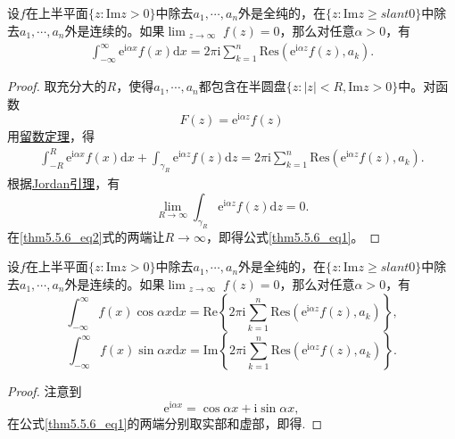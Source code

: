 \documentclass[../../main.tex]{subfiles}
\begin{document}
\begin{theorem}\label{theorem:定理5.5.6}
设$f$在上半平面$\{ z: \mathrm{Im} z > 0 \}$中除去$a_1, \cdots, a_n$外是全纯的，在$\{ z: \mathrm{Im} z \geqslant slant 0 \}$中除去$a_1, \cdots, a_n$外是连续的。如果$\lim_{\substack{z \to \infty}} f(z) = 0$，那么对任意$\alpha > 0$，有
\begin{align}
\int_{-\infty}^{\infty} \mathrm{e}^{\mathrm{i}\alpha x} f(x) \mathrm{d}x = 2\pi \mathrm{i} \sum_{k=1}^{n} \mathrm{Res}(\mathrm{e}^{\mathrm{i}\alpha z} f(z), a_k). \label{thm5.5.6_eq1}
\end{align}
\end{theorem}
\begin{proof}
取充分大的$R$，使得$a_1, \cdots, a_n$都包含在半圆盘$\{ z: |z| < R, \mathrm{Im} z > 0 \}$中。对函数
\[
F(z) = \mathrm{e}^{\mathrm{i}\alpha z} f(z)
\]
用\hyperref[theorem:留数定理(残数定理)-定理5.4.9]{留数定理}，得
\begin{align}
\int_{-R}^{R} \mathrm{e}^{\mathrm{i}\alpha x} f(x) \mathrm{d}x + \int_{\gamma_R} \mathrm{e}^{\mathrm{i}\alpha z} f(z) \mathrm{d}z = 2\pi \mathrm{i} \sum_{k=1}^{n} \mathrm{Res}(\mathrm{e}^{\mathrm{i}\alpha z} f(z), a_k). \label{thm5.5.6_eq2}
\end{align}
根据\hyperref[lemma:Jordan引理]{Jordan引理}，有
\[
\lim_{R \to \infty} \int_{\gamma_R} \mathrm{e}^{\mathrm{i}\alpha z} f(z) \mathrm{d}z = 0.
\]
在\eqref{thm5.5.6_eq2}式的两端让$R \to \infty$，即得公式\eqref{thm5.5.6_eq1}。
\end{proof}

\begin{corollary}\label{corollary:推论5.5.7}
设$f$在上半平面$\{ z: \mathrm{Im} z > 0 \}$中除去$a_1, \cdots, a_n$外是全纯的，在$\{ z: \mathrm{Im} z \geqslant slant 0 \}$中除去$a_1, \cdots, a_n$外是连续的。如果$\lim_{\substack{z \to \infty}} f(z) = 0$，那么对任意$\alpha > 0$，有
\[
\int_{-\infty}^{\infty} f(x) \cos\alpha x \mathrm{d}x = \mathrm{Re} \left\{ 2\pi \mathrm{i} \sum_{k=1}^{n} \mathrm{Res}(\mathrm{e}^{\mathrm{i}\alpha z} f(z), a_k) \right\},
\]
\[
\int_{-\infty}^{\infty} f(x) \sin\alpha x \mathrm{d}x = \mathrm{Im} \left\{ 2\pi \mathrm{i} \sum_{k=1}^{n} \mathrm{Res}(\mathrm{e}^{\mathrm{i}\alpha z} f(z), a_k) \right\}.
\]
\end{corollary}
\begin{proof}
注意到
\[
\mathrm{e}^{\mathrm{i}\alpha x} = \cos\alpha x + \mathrm{i}\sin\alpha x,
\]
在公式\eqref{thm5.5.6_eq1}的两端分别取实部和虚部，即得.
\end{proof}
\end{document}
